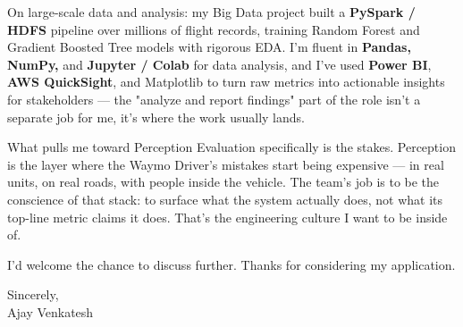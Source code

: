 \documentclass[letterpaper,11pt]{article}
\begin{document}
On large-scale data and analysis: my Big Data project built a \textbf{PySpark / HDFS} pipeline over millions of flight records, training Random Forest and Gradient Boosted Tree models with rigorous EDA. I'm fluent in \textbf{Pandas, NumPy,} and \textbf{Jupyter / Colab} for data analysis, and I've used \textbf{Power BI}, \textbf{AWS QuickSight}, and Matplotlib to turn raw metrics into actionable insights for stakeholders --- the "analyze and report findings" part of the role isn't a separate job for me, it's where the work usually lands.

What pulls me toward Perception Evaluation specifically is the stakes. Perception is the layer where the Waymo Driver's mistakes start being expensive --- in real units, on real roads, with people inside the vehicle. The team's job is to be the conscience of that stack: to surface what the system actually does, not what its top-line metric claims it does. That's the engineering culture I want to be inside of.

I'd welcome the chance to discuss further. Thanks for considering my application.

\vspace{12pt}

Sincerely, \\
Ajay Venkatesh
\end{document}
